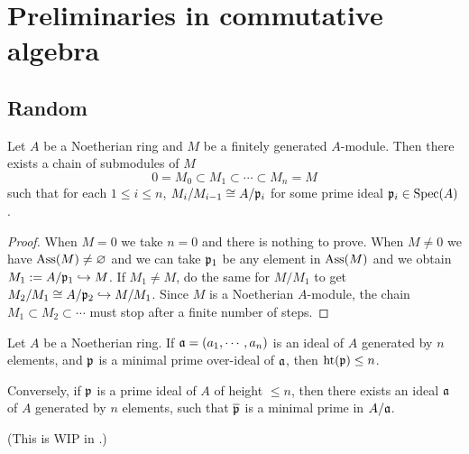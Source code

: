 \section{Preliminaries in commutative algebra}

\subsection{Random}

\begin{prop}
\label{noeth-ring-filtration}
\leanok
Let $A$ be a Noetherian ring and $M$ be a finitely generated $A$-module.
Then there exists a chain of submodules of $M$
\[0 = M_0 \subset M_1 \subset \cdots \subset M_n = M\]
such that for each $1\leq i\leq n$, $M_i/M_{i-1} \cong A/{\mathfrak{p}}_i$ for some prime ideal ${\mathfrak{p}}_i\in{\mathrm{Spec}}(A)$.
\end{prop}

\begin{proof}
\leanok
When $M=0$ we take $n=0$ and there is nothing to prove.
When $M\neq 0$ we have $\operatorname{Ass}(M)\neq\varnothing$
and we can take ${\mathfrak{p}}_1$ be any element in $\operatorname{Ass}(M)$
and we obtain $M_1:=A/{\mathfrak{p}}_1\hookrightarrow M$.
If $M_1\neq M$, do the same for $M/M_1$ to get $M_2/M_1\cong A/{\mathfrak{p}}_2\hookrightarrow M/M_1$.
Since $M$ is a Noetherian $A$-module,
the chain $M_1\subset M_2\subset\cdots$ must stop after a finite number of steps.
\end{proof}

\begin{thm}
\label{krull-principal-ideal-thm}
Let $A$ be a Noetherian ring.
If ${\mathfrak{a}}=(a_1,\cdots,a_n)$ is an ideal of $A$ generated by $n$ elements,
and ${\mathfrak{p}}$ is a minimal prime over-ideal of ${\mathfrak{a}}$, then ${\mathrm{ht}}({\mathfrak{p}})\leq n$.

Conversely, if ${\mathfrak{p}}$ is a prime ideal of $A$ of height $\leq n$,
then there exists an ideal ${\mathfrak{a}}$ of $A$ generated by $n$ elements, such that
$\overline{{\mathfrak{p}}}$ is a minimal prime in $A/{\mathfrak{a}}$.

(This is WIP in .)
\end{thm}


